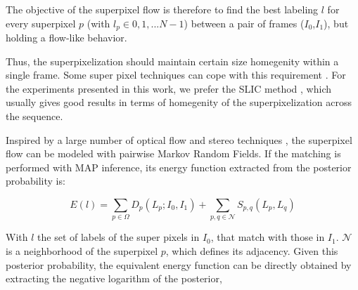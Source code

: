The objective of the superpixel flow is therefore to find the best labeling $l$ for every superpixel $p$
(with $l_p \in {0,1,...N-1}$) between a pair of frames ($I_{0}$,$I_{1}$), but holding a flow-like behavior.

Thus, the superpixelization should maintain certain size homegenity within a single frame. Some super
pixel techniques can cope with this requirement \cite{c9}\cite{c10}. For the experiments presented 
in this work, we prefer the SLIC method \cite{c9}, which usually gives
good results in terms of homegenity of the superpixelization across the sequence. 



Inspired by a large number of optical flow and stereo techniques \cite{c7}\cite{c12}\cite{c13}, 
the superpixel flow can be modeled with pairwise Markov Random Fields. If
the matching is performed with MAP inference, its energy function extracted from the posterior probability is: 


\begin{equation}
E(l) = \displaystyle \sum_{p \in \Omega} D_p(L_p;I_0,I_1) +
\sum_{p,q \in \mathcal{N}} S_{p,q}(L_p,L_q)
\label{eq_energy}
\end{equation}

With $l$ the set of labels of the super pixels in $I_0$,
that match with those in $I_1$.
$ \mathcal{N} $ is a neighborhood of the
superpixel $p$, which defines its adjacency. Given this posterior probability,
the equivalent energy function can be directly obtained
by extracting the negative logarithm of the posterior,

